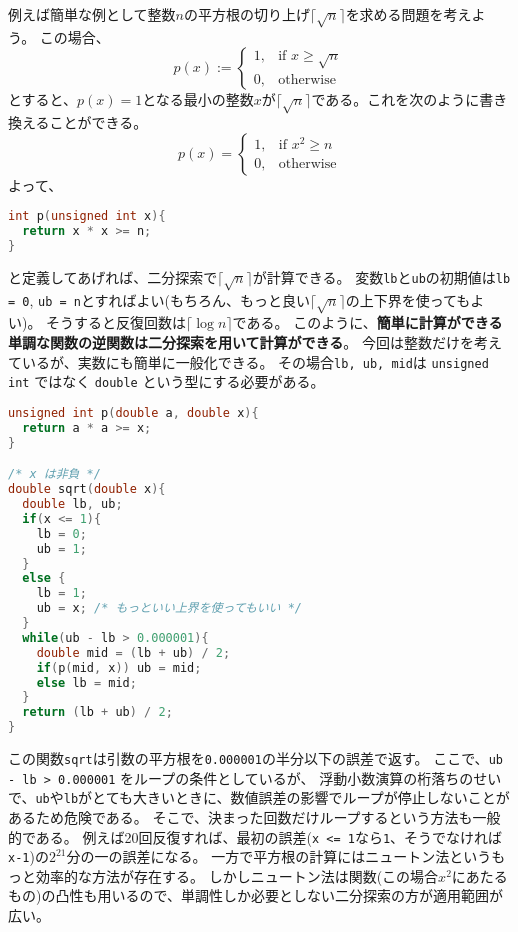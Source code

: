 \documentclass[a4paper,twoside,onecolumn,openany,article,10pt]{memoir}
\theoremstyle{remark}
\begin{document}
例えば簡単な例として整数$n$の平方根の切り上げ$\lceil \sqrt{n}\rceil$を求める問題を考えよう。
この場合、
\begin{equation*}
p(x) :=
\begin{cases}
1,& \text{if } x \ge \sqrt{n}\\
0,& \text{otherwise}
\end{cases}
\end{equation*}
とすると、$p(x)=1$となる最小の整数$x$が$\lceil\sqrt{n}\rceil$である。これを次のように書き換えることができる。
\begin{equation*}
p(x) =
\begin{cases}
1,& \text{if } x^2 \ge n\\
0,& \text{otherwise}
\end{cases}
\end{equation*}
よって、
\begin{lstlisting}[basicstyle=\ttfamily\normalsize,showstringspaces=false,language=C,frame=single]
int p(unsigned int x){
  return x * x >= n;
}
\end{lstlisting}
と定義してあげれば、二分探索で$\lceil \sqrt{n}\rceil$が計算できる。
変数\texttt{lb}と\texttt{ub}の初期値は\texttt{lb = 0}, \texttt{ub = n}とすればよい(もちろん、もっと良い$\lceil\sqrt{n}\rceil$の上下界を使ってもよい)。
そうすると反復回数は$\lceil\log n\rceil$である。
このように、\textbf{簡単に計算ができる単調な関数の逆関数は二分探索を用いて計算ができる}。
今回は整数だけを考えているが、実数にも簡単に一般化できる。
その場合\texttt{lb, ub, mid}は \texttt{unsigned int} ではなく \texttt{double} という型にする必要がある。

\begin{minipage}{\linewidth}
\begin{lstlisting}[basicstyle=\ttfamily\normalsize,showstringspaces=false,language=C,frame=single]
unsigned int p(double a, double x){
  return a * a >= x;
}

/* x は非負 */
double sqrt(double x){
  double lb, ub;
  if(x <= 1){
    lb = 0;
    ub = 1;
  }
  else {
    lb = 1;
    ub = x; /* もっといい上界を使ってもいい */
  }
  while(ub - lb > 0.000001){
    double mid = (lb + ub) / 2;
    if(p(mid, x)) ub = mid;
    else lb = mid;
  }
  return (lb + ub) / 2;
}
\end{lstlisting}
\end{minipage}
この関数\texttt{sqrt}は引数の平方根を\texttt{0.000001}の半分以下の誤差で返す。
ここで、\texttt{ub - lb > 0.000001} をループの条件としているが、
浮動小数演算の桁落ちのせいで、\texttt{ub}や\texttt{lb}がとても大きいときに、数値誤差の影響でループが停止しないことがあるため危険である。
そこで、決まった回数だけループするという方法も一般的である。
例えば20回反復すれば、最初の誤差(\texttt{x <= 1}なら\texttt{1}、そうでなければ\texttt{x-1})の$2^{21}$分の一の誤差になる。
一方で平方根の計算にはニュートン法というもっと効率的な方法が存在する。
しかしニュートン法は関数(この場合$x^2$にあたるもの)の凸性も用いるので、単調性しか必要としない二分探索の方が適用範囲が広い。
\end{document}
